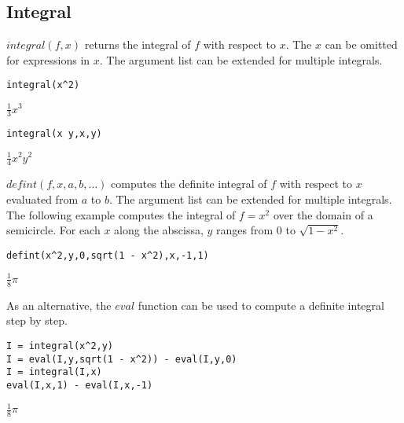 \subsection{Integral}

$integral(f,x)$ returns the integral of $f$ with respect to $x$.
The $x$ can be omitted for expressions in $x$.
The argument list can be extended for multiple integrals.

\begin{Verbatim}[formatcom=\color{blue},samepage=true]
integral(x^2)
\end{Verbatim}

\noindent
$\displaystyle \tfrac{1}{3}x^3$

\begin{Verbatim}[formatcom=\color{blue},samepage=true]
integral(x y,x,y)
\end{Verbatim}

\noindent
$\displaystyle \tfrac{1}{4}x^2y^2$

\bigskip
\noindent
$defint(f,x,a,b,\ldots)$
computes the definite integral of $f$ with respect to $x$ evaluated from
$a$ to $b$.
The argument list can be extended for multiple integrals.
The following example computes the integral of $f=x^2$
over the domain of a semicircle.
For each $x$ along the abscissa, $y$ ranges from 0 to $\sqrt{1-x^2}$.

\begin{Verbatim}[formatcom=\color{blue},samepage=true]
defint(x^2,y,0,sqrt(1 - x^2),x,-1,1)
\end{Verbatim}

\noindent
$\displaystyle \tfrac{1}{8}\pi$

\bigskip
\noindent
As an alternative, the $eval$ function can be used to compute a definite integral step by step.

\begin{Verbatim}[formatcom=\color{blue},samepage=true]
I = integral(x^2,y)
I = eval(I,y,sqrt(1 - x^2)) - eval(I,y,0)
I = integral(I,x)
eval(I,x,1) - eval(I,x,-1)
\end{Verbatim}

\noindent
$\displaystyle \tfrac{1}{8}\pi$
